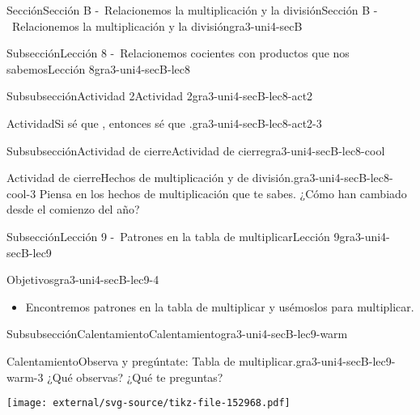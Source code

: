 \documentclass[twoside,14pt,]{extarticle}
\begin{document}
\begin{sectionptx}{Sección}{Sección B -~Relacionemos la multiplicación y la división}{}{Sección B -~Relacionemos la multiplicación y la división}{}{}{gra3-uni4-secB}
\begin{subsectionptx}{Subsección}{Lección 8 -~Relacionemos cocientes con productos que nos sabemos}{}{Lección 8}{}{}{gra3-uni4-secB-lec8}
\begin{subsubsectionptx}{Subsubsección}{Actividad 2}{}{Actividad 2}{}{}{gra3-uni4-secB-lec8-act2}
\begin{activity}{Actividad}{Si sé que \textellipsis{}, entonces sé que \textellipsis{}.}{gra3-uni4-secB-lec8-act2-3}
\begin{center}
{}%
\end{center}%
\end{activity}%
\end{subsubsectionptx}
%
%
\typeout{************************************************}
\typeout{************************************************}
%
\begin{subsubsectionptx}{Subsubsección}{Actividad de cierre}{}{Actividad de cierre}{}{}{gra3-uni4-secB-lec8-cool}
\begin{project}{Actividad de cierre}{Hechos de multiplicación y de división.}{gra3-uni4-secB-lec8-cool-3}%
Piensa en los hechos de multiplicación que te sabes. ¿Cómo han cambiado desde el comienzo del año?%
\end{project}%
\end{subsubsectionptx}
\end{subsectionptx}
%
%
\typeout{************************************************}
\typeout{************************************************}
%
\begin{subsectionptx}{Subsección}{Lección 9 -~Patrones en la tabla de multiplicar}{}{Lección 9}{}{}{gra3-uni4-secB-lec9}
\begin{objectives}{Objetivos}{gra3-uni4-secB-lec9-4}
%
\begin{itemize}[label=\textbullet]
\item{}Encontremos patrones en la tabla de multiplicar y usémoslos para multiplicar.%
\end{itemize}
\end{objectives}
%
%
\typeout{************************************************}
\typeout{************************************************}
%
\begin{subsubsectionptx}{Subsubsección}{Calentamiento}{}{Calentamiento}{}{}{gra3-uni4-secB-lec9-warm}
\begin{exploration}{Calentamiento}{Observa y pregúntate: Tabla de multiplicar.}{gra3-uni4-secB-lec9-warm-3}%
¿Qué observas? ¿Qué te preguntas?%
\begin{image}{0}{1}{0}{}%
\texttt{[image: external/svg-source/tikz-file-152968.pdf]}
\end{image}%
\end{exploration}%
\end{subsubsectionptx}
%
%
\typeout{************************************************}

\end{subsectionptx}
\end{sectionptx}
\end{document}
